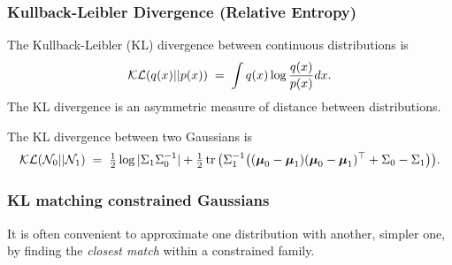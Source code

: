 \begin{frame}
\frametitle{Kullback-Leibler Divergence (Relative Entropy)}

The Kullback-Leibler (KL) divergence between continuous distributions is
%
\[
{\cal KL}(q(x)||p(x))\;=\;\int q(x)\log\frac{q(x)}{p(x)}dx.
\]
%
The KL divergence is an asymmetric measure of distance between distributions.

The KL divergence between two Gaussians is
\[
{\cal KL}({\cal N}_0||{\cal N}_1)\;=\;\tfrac{1}{2}\log|\Sigma_1\Sigma_0^{-1}|
+\tfrac{1}{2}\operatorname{tr}\big(\Sigma_1^{-1}
\big((\boldsymbol{\mu}_0-\boldsymbol{\mu}_1)
(\boldsymbol{\mu}_0-\boldsymbol{\mu}_1)^\top + \Sigma_0 - \Sigma_1\big)\big).
\]

\end{frame}

\begin{frame}
\frametitle{KL matching constrained Gaussians}

It is often convenient to approximate one distribution with another,
simpler one, by finding the \emph{closest match} within a constrained family.\\[1ex]


\end{frame}
